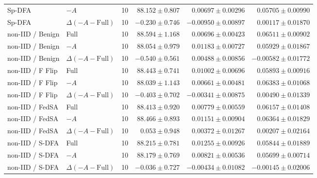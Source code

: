 \begin{table}[t]
\begin{tabular}{llrrrr}
Sp-DFA & $-A$ & 10 & $88.152 \pm 0.807$ & $0.00697 \pm 0.00296$ & $0.05705 \pm 0.00990$ \\
Sp-DFA & $\Delta(-A-\mathrm{Full})$ & 10 & $-0.230 \pm 0.746$ & $-0.00950 \pm 0.00897$ & $0.00117 \pm 0.01870$ \\
non-IID / Benign & Full & 10 & $88.594 \pm 1.168$ & $0.00696 \pm 0.00423$ & $0.06511 \pm 0.00902$ \\
non-IID / Benign & $-A$ & 10 & $88.054 \pm 0.979$ & $0.01183 \pm 0.00727$ & $0.05929 \pm 0.01867$ \\
non-IID / Benign & $\Delta(-A-\mathrm{Full})$ & 10 & $-0.540 \pm 0.561$ & $0.00488 \pm 0.00856$ & $-0.00582 \pm 0.01772$ \\
non-IID / F Flip & Full & 10 & $88.443 \pm 0.741$ & $0.01002 \pm 0.00696$ & $0.05893 \pm 0.00916$ \\
non-IID / F Flip & $-A$ & 10 & $88.039 \pm 1.143$ & $0.00661 \pm 0.00481$ & $0.06383 \pm 0.01068$ \\
non-IID / F Flip & $\Delta(-A-\mathrm{Full})$ & 10 & $-0.403 \pm 0.702$ & $-0.00341 \pm 0.00875$ & $0.00490 \pm 0.01339$ \\
non-IID / FedSA & Full & 10 & $88.413 \pm 0.920$ & $0.00779 \pm 0.00559$ & $0.06157 \pm 0.01408$ \\
non-IID / FedSA & $-A$ & 10 & $88.466 \pm 0.893$ & $0.01151 \pm 0.00904$ & $0.06364 \pm 0.01829$ \\
non-IID / FedSA & $\Delta(-A-\mathrm{Full})$ & 10 & $0.053 \pm 0.948$ & $0.00372 \pm 0.01267$ & $0.00207 \pm 0.02164$ \\
non-IID / S-DFA & Full & 10 & $88.215 \pm 0.781$ & $0.01255 \pm 0.00926$ & $0.05844 \pm 0.01889$ \\
non-IID / S-DFA & $-A$ & 10 & $88.179 \pm 0.769$ & $0.00821 \pm 0.00536$ & $0.05699 \pm 0.00714$ \\
non-IID / S-DFA & $\Delta(-A-\mathrm{Full})$ & 10 & $-0.036 \pm 0.727$ & $-0.00434 \pm 0.01082$ & $-0.00145 \pm 0.02006$ \\
\bottomrule
\end{tabular}
\end{table}

